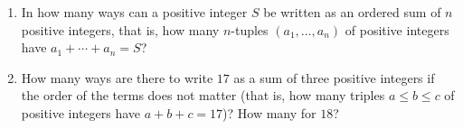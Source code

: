 \begin{enumerate}
\item[(a)] In how many ways can a positive integer $S$ be written as an ordered sum of $n$ positive integers, that is, how many $n$-tuples $(a_1,\dots,a_n)$ of positive integers have $a_1+\cdots+a_n=S$?
\item[(b)] How many ways are there to write $17$ as a sum of three positive integers if the order of the terms does not matter (that is, how many triples $a\le b\le c$ of positive integers have $a+b+c=17$)? How many for $18$?
\end{enumerate}
